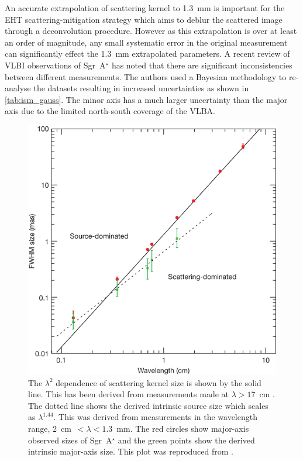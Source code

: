 An accurate extrapolation of scattering kernel to 1.3~mm is important for the EHT scattering-mitigation strategy \cite{Fish_2014} which aims to deblur the scattered image through a deconvolution procedure. However as this extrapolation is over at least an order of magnitude, any small systematic error in the original measurement can significantly effect the 1.3~mm extrapolated parameters. A recent review of VLBI observations of Sgr~A$^\star$ \cite{Psaltis_2015} has noted that there are significant inconsistencies between different measurements. The authors used a Bayesian methodology to re-analyse the datasets resulting in increased uncertainties as shown in \ref{tab:ism_gauss}. The minor axis has a much larger uncertainty than the major axis due to the limited north-south coverage of the VLBA. 
\begin{figure}
\begin{center}
\includegraphics[width=0.6\columnwidth]{Images/scattering_law}
\caption{The $\lambda^2$ dependence of scattering kernel size is shown by the solid line. This has been derived from measurements made at $\lambda > 17$~cm \cite{Bower_2006}. The dotted line shows the derived intrinsic source size which scales as $\lambda^1.44$. This was derived from measurements in the wavelength range, 2~cm~$< \lambda < 1.3$~mm. The red circles show major-axis observed sizes of Sgr~A$^\star$  and the green points show the derived intrinsic major-axis size. This plot was reproduced from \citet{Doeleman_2008}.\label{fig:scattering_law}
}
\end{center}
\end{figure}
